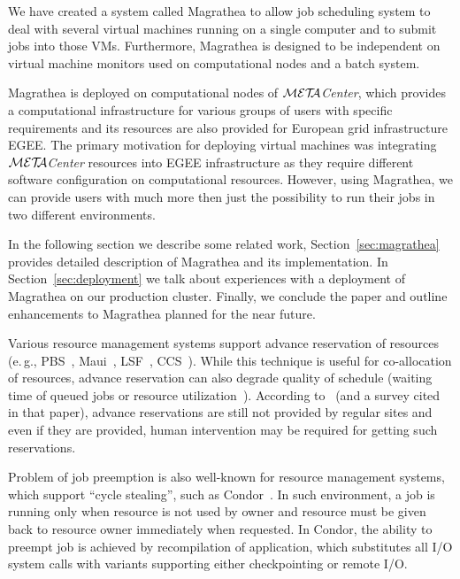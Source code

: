\documentclass[times,10pt,twocolumn]{article}
\def\META#1{\textit{${\cal MET\!\!A}$#1}}
\begin{document}
We have created a system called Magrathea to allow job scheduling system to
deal with several virtual machines running on a single computer and to submit
jobs into those VMs. Furthermore, Magrathea is designed to be independent on
virtual machine monitors used on computational nodes and a batch system.

Magrathea is deployed on computational nodes of \META{Center}, which provides
a computational infrastructure for various groups of users with specific
requirements and its resources are also provided for European grid
infrastructure EGEE. The primary motivation for deploying virtual machines was
integrating \META{Center} resources into EGEE infrastructure as they require
different software configuration on computational resources. However, using
Magrathea, we can provide users with much more then just the possibility to
run their jobs in two different environments.

In the following section we describe some related work,
Section~\ref{sec:magrathea} provides detailed description of Magrathea and its
implementation. In Section~\ref{sec:deployment} we talk about experiences with
a deployment of Magrathea on our production cluster. Finally, we conclude the
paper and outline enhancements to Magrathea planned for the near future.



Various resource management systems support advance reservation of resources
(e.\,g., PBS~\cite{pbs}, Maui~\cite{maui}, LSF~\cite{lsf}, CCS~\cite{ccs}).
While this technique is useful for co-allocation of resources, advance
reservation can also degrade quality of schedule (waiting time of queued jobs
or resource utilization~\cite{smith}). According to~\cite{singh} (and a survey
cited in that paper), advance reservations are still not provided by regular
sites and even if they are provided, human intervention may be required for
getting such reservations.

Problem of job preemption is also well-known for resource management systems,
which support ``cycle stealing'', such as Condor~\cite{condor}. In such
environment, a job is running only when resource is not used by owner and
resource must be given back to resource owner immediately when requested. In
Condor, the ability to preempt job is achieved by recompilation of
application, which substitutes all I/O system calls with variants supporting
either checkpointing or remote I/O.
\end{document}
